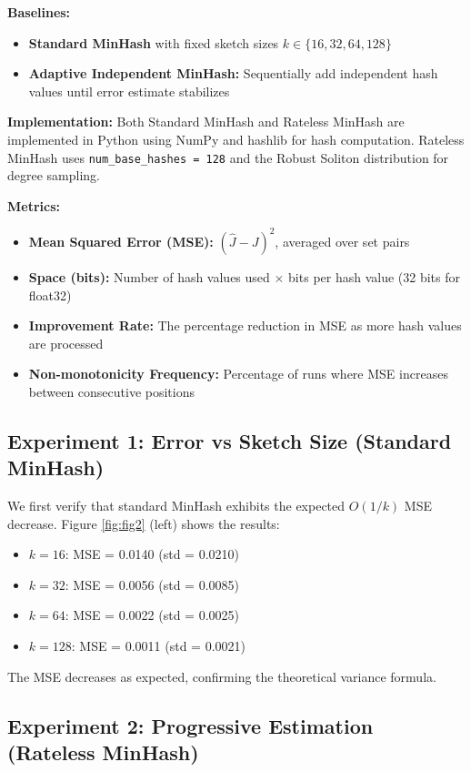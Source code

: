 \documentclass[11pt,letterpaper]{article}
\begin{document}
\textbf{Baselines:}
\begin{itemize}
    \item \textbf{Standard MinHash} with fixed sketch sizes $k \in \{16, 32, 64, 128\}$
    \item \textbf{Adaptive Independent MinHash:} Sequentially add independent hash values until error estimate stabilizes
\end{itemize}

\textbf{Implementation:} Both Standard MinHash and Rateless MinHash are implemented in Python using NumPy and hashlib for hash computation. Rateless MinHash uses \texttt{num\_base\_hashes = 128} and the Robust Soliton distribution for degree sampling.

\textbf{Metrics:}
\begin{itemize}
    \item \textbf{Mean Squared Error (MSE):} $(\hat{J} - J)^2$, averaged over set pairs
    \item \textbf{Space (bits):} Number of hash values used $\times$ bits per hash value (32 bits for float32)
    \item \textbf{Improvement Rate:} The percentage reduction in MSE as more hash values are processed
    \item \textbf{Non-monotonicity Frequency:} Percentage of runs where MSE increases between consecutive positions
\end{itemize}

\subsection{Experiment 1: Error vs Sketch Size (Standard MinHash)}

We first verify that standard MinHash exhibits the expected $O(1/k)$ MSE decrease. Figure \ref{fig:fig2} (left) shows the results:

\begin{itemize}
    \item $k=16$: MSE = 0.0140 (std = 0.0210)
    \item $k=32$: MSE = 0.0056 (std = 0.0085)
    \item $k=64$: MSE = 0.0022 (std = 0.0025)
    \item $k=128$: MSE = 0.0011 (std = 0.0021)
\end{itemize}

The MSE decreases as expected, confirming the theoretical variance formula.

\subsection{Experiment 2: Progressive Estimation (Rateless MinHash)}
\end{document}
